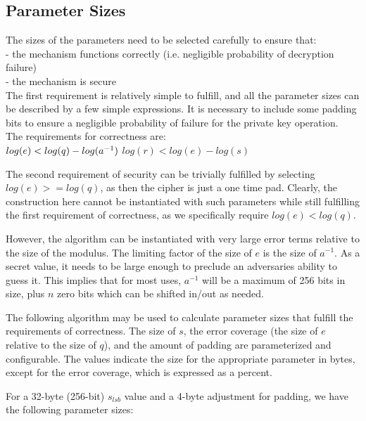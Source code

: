 \documentclass[preprint]{iacrtrans}
\begin{document}
\subsection{Parameter Sizes}
The sizes of the parameters need to be selected carefully to ensure that:\\
- the mechanism functions correctly (i.e. negligible probability of decryption failure)\\
- the mechanism is secure\\

The first requirement is relatively simple to fulfill, and all the parameter sizes can be described by a few simple expressions. It is necessary to include some padding bits to ensure a negligible probability of failure for the private key operation.\\

The requirements for correctness are:\\
$log(e) <  log(q) - log(a^{-1})\\$
$log(r) < log(e) - log(s)$

The second requirement of security can be trivially fulfilled by selecting $log(e) >= log(q)$, as then the cipher is just a one time pad. Clearly, the construction here cannot be instantiated with such parameters while still fulfilling the first requirement of correctness, as we specifically require $log(e) < log(q)$. 

However, the algorithm can be instantiated with very large error terms relative to the size of the modulus. The limiting factor of the size of $e$ is the size of $a^{-1}$. As a secret value, it needs to be large enough to preclude an adversaries ability to guess it. This implies that for most uses, $a^{-1}$ will be a maximum of 256 bits in size, plus $n$ zero bits which can be shifted in/out as needed.

The following algorithm may be used to calculate parameter sizes that fulfill the requirements of correctness. The size of $s$, the error coverage (the size of $e$ relative to the size of $q$), and the amount of padding are parameterized and configurable. The values indicate the size for the appropriate parameter in  bytes, except for the error coverage, which is expressed as a percent.


For a 32-byte (256-bit) $s_{lsb}$ value and a 4-byte adjustment for padding, we have the following parameter sizes:
\end{document}
